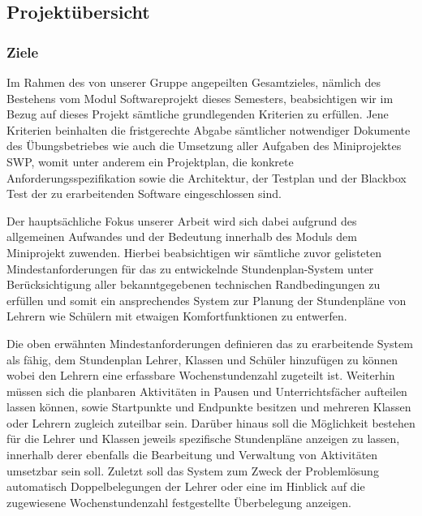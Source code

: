 \documentclass[fontsize=12pt,paper=a4,twoside]{scrartcl}
\begin{document}
\subsection{Projektübersicht}

\subsubsection{Ziele}

Im Rahmen des von unserer Gruppe angepeilten Gesamtzieles, nämlich des Bestehens vom Modul Softwareprojekt dieses Semesters, beabsichtigen wir im Bezug auf dieses Projekt sämtliche grundlegenden Kriterien zu erfüllen. Jene Kriterien beinhalten die fristgerechte Abgabe sämtlicher notwendiger Dokumente des Übungsbetriebes wie auch die Umsetzung aller Aufgaben des Miniprojektes SWP, womit unter anderem ein Projektplan, die konkrete Anforderungsspezifikation sowie die Architektur, der Testplan und der Blackbox Test der zu erarbeitenden Software eingeschlossen sind.

Der hauptsächliche Fokus unserer Arbeit wird sich dabei aufgrund des allgemeinen Aufwandes und der Bedeutung innerhalb des Moduls dem Miniprojekt zuwenden.
Hierbei beabsichtigen wir sämtliche zuvor gelisteten Mindestanforderungen für das zu entwickelnde Stundenplan-System unter Berücksichtigung aller bekanntgegebenen technischen Randbedingungen zu erfüllen und somit ein ansprechendes System zur Planung der Stundenpläne von Lehrern wie Schülern mit etwaigen Komfortfunktionen zu entwerfen.

Die oben erwähnten Mindestanforderungen definieren das zu erarbeitende System als fähig, dem Stundenplan Lehrer, Klassen und Schüler hinzufügen zu können wobei den Lehrern eine erfassbare Wochenstundenzahl zugeteilt ist.\newline
Weiterhin müssen sich die planbaren Aktivitäten in Pausen und Unterrichtsfächer aufteilen lassen können, sowie Startpunkte und Endpunkte besitzen und mehreren Klassen oder Lehrern zugleich zuteilbar sein.\newline
Darüber hinaus soll die Möglichkeit bestehen für die Lehrer und Klassen jeweils spezifische Stundenpläne anzeigen zu lassen, innerhalb derer ebenfalls die Bearbeitung und Verwaltung von Aktivitäten umsetzbar sein soll.\newline
Zuletzt soll das System zum Zweck der Problemlösung automatisch Doppelbelegungen der Lehrer oder eine im Hinblick auf die zugewiesene Wochenstundenzahl festgestellte Überbelegung anzeigen.
\end{document}
